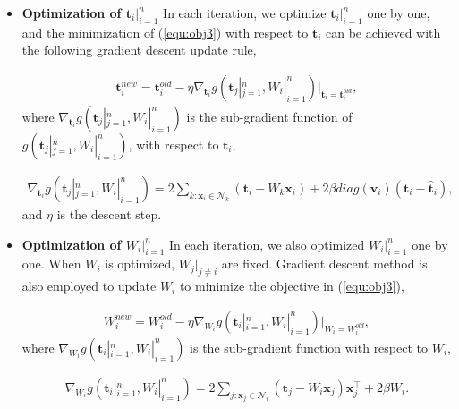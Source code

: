 \documentclass[runningheads,a4paper]{llncs}
\newcommand{\bfx}{{\textbf{x}}}
\newcommand{\bfv}{{\textbf{v}}}
\newcommand{\bft}{{\textbf{t}}}
\begin{document}
\begin{itemize}
\item \textbf{Optimization of $\bft_i|_{i=1}^n$}
In each iteration, we optimize $\bft_i|_{i=1}^n$ one by one, and the minimization of (\ref{equ:obj3}) with respect to $\bft_i$ can be achieved with the following gradient descent update rule,

\begin{equation}
\label{equ:ti}
\begin{aligned}
\bft_i^{new} = \bft_i^{old} - \eta \nabla_{\bft_i}g
(\bft_j|_{j=1}^n,W_i|_{i=1}^n)
|_{\bft_i=\bft_i^{old}},
\end{aligned}
\end{equation}
where $\nabla_{\bft_i}g(\bft_j|_{j=1}^n,W_i|_{i=1}^n)$ is the sub-gradient function of $g(\bft_j|_{j=1}^n,W_i|_{i=1}^n)$, with respect to $\bft_i$,

\begin{equation}
\label{equ:gradient}
\begin{aligned}
\nabla_{\bft_i}g
(\bft_j|_{j=1}^n,W_i|_{i=1}^n)
= 2 \sum_{k:\bfx_i \in \mathcal{N}_k} (\bft_i - W_k \bfx_i) + 2\beta diag(\bfv_i) (\bft_i - \widehat{\bft}_i),
\end{aligned}
\end{equation}
and $\eta$ is the descent step.

\item \textbf{Optimization of $W_i|_{i=1}^n$}
In each iteration, we also optimized $W_i|_{i=1}^n$ one by one. When $W_i$ is optimized, $W_j|_{j\neq i}$ are fixed. Gradient descent method is also employed to update $W_i$ to minimize the objective in (\ref{equ:obj3}),

\begin{equation}
\label{equ:w1}
\begin{aligned}
W_i^{new} = W_i^{old} - \eta \nabla_{W_i} g(\bft_i|_{i=1}^n, W_i|_{i=1}^n)|_{W_i=W_i^{old}},
\end{aligned}
\end{equation}
where $\nabla_{W_i} g(\bft_i|_{i=1}^n, W_i|_{i=1}^n)$ is the sub-gradient function with respect to $W_i$,

\begin{equation}
\label{equ:w2}
\begin{aligned}
\nabla_{W_i} g(\bft_i|_{i=1}^n, W_i|_{i=1}^n)
= 2 \sum_{j:\bfx_j \in \mathcal{N}_i} (\bft_j - W_i \bfx_j) \bfx_j^\top + 2 \beta W_i.
\end{aligned}
\end{equation}

\end{itemize}
\end{document}
